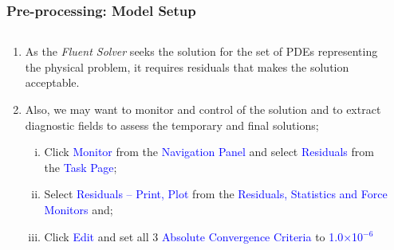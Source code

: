 \documentclass[10pt,compress, unknownkeysallowed]{beamer}
\newcommand{\blue}{\textcolor{blue}}
\begin{document}
\begin{frame}
  \frametitle{Pre-processing: Model Setup}
    \begin{columns}
        \begin{column}[l]{0.5\linewidth}
           \begin{enumerate}\scriptsize
               \item<1-> As the {\it Fluent Solver} seeks the solution for the set of PDEs representing the physical problem, it requires residuals that makes the solution acceptable.
               \item<1-> Also, we may want to monitor and control of the solution and to extract diagnostic fields to assess the temporary and final solutions;  
                    \begin{enumerate}[i)]\scriptsize
                       \item<2-> Click \blue{Monitor} from the \blue{Navigation Panel} and select \blue{Residuals} from the \blue{Task Page};
                       \item<2-> Select \blue{Residuals -- Print, Plot} from the \blue{Residuals, Statistics and Force Monitors} and;
                       \item<2-> Click \blue{Edit} and set all 3 \blue{Absolute Convergence Criteria} to \blue{1.0$\times$10$^{-6}$}
                   \end{enumerate}
           \end{enumerate}


           
        \end{column}
           \begin{column}[l]{0.5\linewidth}
           \end{column}
    \end{columns}
\end{frame}
\end{document}
